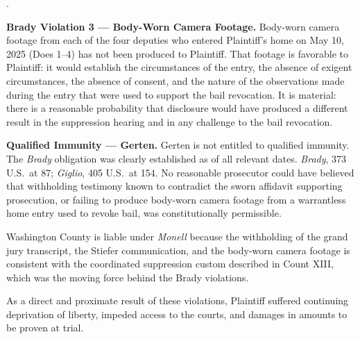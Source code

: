 \documentclass[12pt,letterpaper]{article}
\newcounter{complaintpara}
\newenvironment{paras}{%
	\begin{list}{\arabic{complaintpara}.}{%
			\setlength{\leftmargin}{0.5in}%
			\setlength{\labelwidth}{0.4in}%
			\setlength{\labelsep}{0.1in}%
			\setlength{\itemsep}{0pt}%
			\setlength{\parsep}{0pt}%
			\setlength{\topsep}{6pt}%
		}%
	}{%
	\end{list}%
}
\begin{document}
\begin{paras}
		\item \textbf{Brady Violation 3 --- Body-Worn Camera Footage.}
		Body-worn camera footage from each of the four deputies who
		entered Plaintiff's home on May 10, 2025 (Does 1--4) has not
		been produced to Plaintiff. That footage is favorable to
		Plaintiff: it would establish the circumstances of the entry,
		the absence of exigent circumstances, the absence of consent,
		and the nature of the observations made during the entry that
		were used to support the bail revocation. It is material:
		there is a reasonable probability that disclosure would have
		produced a different result in the suppression hearing and in
		any challenge to the bail revocation.
		
		\item \textbf{Qualified Immunity --- Gerten.} Gerten is not
		entitled to qualified immunity. The \textit{Brady} obligation
		was clearly established as of all relevant dates.
		\textit{Brady}, 373 U.S.\ at 87; \textit{Giglio},
		405 U.S.\ at 154. No reasonable prosecutor could have
		believed that withholding testimony known to contradict the
		sworn affidavit supporting prosecution, or failing to produce
		body-worn camera footage from a warrantless home entry used
		to revoke bail, was constitutionally permissible.
		
		\item Washington County is liable under \textit{Monell} because
		the withholding of the grand jury transcript, the Stiefer
		communication, and the body-worn camera footage is consistent
		with the coordinated suppression custom described in
		Count XIII, which was the moving force behind the Brady
		violations.
		
		\item As a direct and proximate result of these violations,
		Plaintiff suffered continuing deprivation of liberty,
		impeded access to the courts, and damages in amounts to be
		proven at trial.
		
	\end{paras}
\end{document}
